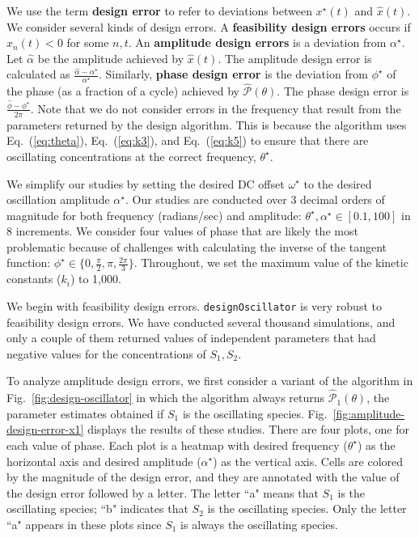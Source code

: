 \documentclass{bmcart}
\newcommand{\eqn}[1]{Eq.~(\ref{#1})}
\newcommand{\fig}[1]{Fig.~\ref{#1}}
\begin{document}
We use the term {\bf design error} to refer to deviations between $x^{\star}(t)$ and $\hat{x}(t)$. We consider several kinds of design errors. A {\bf feasibility design errors} occurs
        if $\hat{x}_n (t) < 0$ for some $n, t$. An {\bf amplitude design errors} is a deviation from $\alpha^{\star}$. Let $\hat{\alpha}$ be the amplitude achieved by $\hat{x}(t).$ The amplitude design error is calculated as $\frac{\hat{\alpha} - \alpha^{\star}}{\alpha^{\star}}$. Similarly, {\bf phase design error} is the deviation from $\phi^{\star}$ of the phase (as a fraction of a cycle) achieved by $\hat{\mathcal{P}}(\theta)$. The phase design error is $\frac{\hat{\phi} - \phi^{\star}}{2\pi}$.
Note that we do not consider errors in the frequency that result from the parameters returned by the design algorithm. This is because the algorithm uses \eqn{eq:theta}, \eqn{eq:k3}, and \eqn{eq:k5} to ensure that there are oscillating concentrations at the correct frequency, $\theta^{\star}$.

We simplify our studies by setting the desired DC offset $\omega^{\star}$ to the desired oscillation
amplitude $\alpha^{\star}$. Our studies are conducted over 3 decimal orders of magnitude for both frequency (radians/sec) and amplitude: $\theta^{\star}, \alpha^{\star} \in [0.1, 100]$ in 8 increments. We consider four values of phase that are likely the most problematic because of challenges with calculating the inverse of the tangent function: $\phi^{\star} \in \{0, \frac{\pi}{2}, \pi, \frac{2 \pi}{3} \}.$ Throughout, we set the maximum value of the kinetic constants ($k_i$) to 1,000.

We begin with feasibility design errors. {\tt designOscillator} is very robust to feasibility design errors. We have conducted several thousand simulations, and only a couple of them returned values of independent parameters that had negative values for the concentrations of $S_1, S_2$.

To analyze amplitude design errors, we first consider a variant of the algorithm in \fig{fig:design-oscillator} in which the algorithm always returns $\hat{\mathcal{P}}_1 (\theta)$, the parameter estimates obtained if $S_1$ is the oscillating species. \fig{fig:amplitude-design-error-x1} displays the results of these studies. There are four plots, one for each value of phase. Each plot is a heatmap with desired frequency ($\theta^{\star}$) as the horizontal axis and desired amplitude ($\alpha^{\star}$) as the vertical axis. Cells are colored by the magnitude of the design error, and they are annotated with the value of the design error followed by a letter. The letter ``a" means that $S_1$ is the oscillating species; ``b" indicates that $S_2$ is the oscillating species. Only the letter ``a" appears in these plots since $S_1$ is always the oscillating species.
\end{document}
